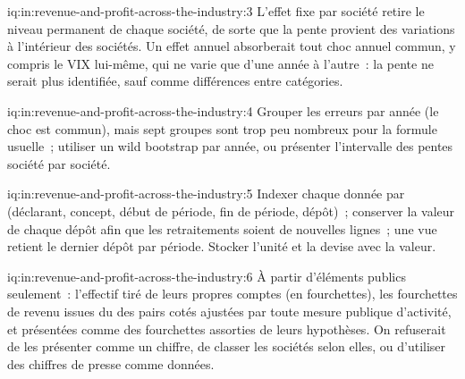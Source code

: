 \begin{solution}{iq:in:revenue-and-profit-across-the-industry:3}
L'effet fixe par société retire le niveau permanent de chaque société, de sorte que la pente provient des variations à l'intérieur des sociétés. Un effet annuel absorberait
tout choc annuel commun, y compris le VIX lui-même, qui ne varie que d'une année à l'autre~: la pente ne serait plus
identifiée, sauf comme différences entre catégories.
\end{solution}

\begin{solution}{iq:in:revenue-and-profit-across-the-industry:4}
Grouper les erreurs par année (le choc est commun), mais sept groupes sont trop peu nombreux pour la formule usuelle~; utiliser un wild bootstrap par
année, ou présenter l'intervalle des pentes société par société.
\end{solution}

\begin{solution}{iq:in:revenue-and-profit-across-the-industry:5}
Indexer chaque donnée par (déclarant, concept, début de période, fin de période, dépôt)~; conserver la valeur de chaque dépôt afin que les retraitements soient de nouvelles
lignes~; une vue retient le dernier dépôt par période. Stocker l'unité et la devise avec la valeur.
\end{solution}

\begin{solution}{iq:in:revenue-and-profit-across-the-industry:6}
À partir d'éléments publics seulement~: l'effectif tiré de leurs propres comptes (en fourchettes), les fourchettes de revenu issues du  des pairs cotés
ajustées par toute mesure publique d'activité, et présentées comme des fourchettes assorties de leurs hypothèses. On refuserait
de les présenter comme un chiffre, de classer les sociétés selon elles, ou d'utiliser des chiffres de presse comme données.
\end{solution}
